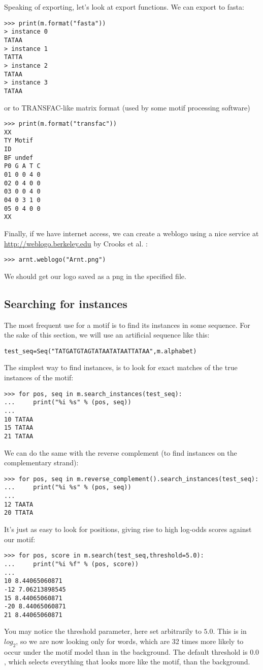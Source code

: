 \documentclass{article}
\begin{document}
Speaking of exporting, let's look at export functions. We can export to fasta:
\begin{verbatim}
>>> print(m.format("fasta"))
> instance 0
TATAA
> instance 1
TATTA
> instance 2
TATAA
> instance 3
TATAA
\end{verbatim}
or to TRANSFAC-like matrix format (used by some motif processing software)
\begin{verbatim}
>>> print(m.format("transfac"))
XX
TY Motif
ID 
BF undef
P0 G A T C
01 0 0 4 0
02 0 4 0 0
03 0 0 4 0
04 0 3 1 0
05 0 4 0 0
XX
\end{verbatim}

Finally, if we have internet access, we can create a weblogo using a nice service at \url{http://weblogo.berkeley.edu} by Crooks et al. \cite{crooks2004}:
\begin{verbatim}
>>> arnt.weblogo("Arnt.png")
\end{verbatim}
We should get our logo saved as a png in the specified file.

\subsection{Searching for instances}
\label{sec:search}

The most frequent use for a motif is to find its instances in some
sequence. For the sake of this section, we will use an artificial sequence like this:

\begin{verbatim}
test_seq=Seq("TATGATGTAGTATAATATAATTATAA",m.alphabet)
\end{verbatim}

The simplest way to find instances, is to look for exact matches of
the true instances of the motif:
\begin{verbatim}
>>> for pos, seq in m.search_instances(test_seq):
...     print("%i %s" % (pos, seq))
... 
10 TATAA
15 TATAA
21 TATAA
\end{verbatim}
We can do the same with the reverse complement (to find instances on the complementary strand):
\begin{verbatim}
>>> for pos, seq in m.reverse_complement().search_instances(test_seq):
...     print("%i %s" % (pos, seq))
... 
12 TAATA
20 TTATA
\end{verbatim}

It's just as easy to look for positions, giving rise to high log-odds scores against our motif:
\begin{verbatim}
>>> for pos, score in m.search(test_seq,threshold=5.0):
...     print("%i %f" % (pos, score))
... 
10 8.44065060871
-12 7.06213898545
15 8.44065060871
-20 8.44065060871
21 8.44065060871
\end{verbatim}
You may notice the threshold parameter, here set arbitrarily to
$5.0$. This is in $log_2$, so we are now looking only for words, which
are 32 times more likely to occur under the motif model than in the
background. The default threshold is $0.0$, which selects everything
that looks more like the motif, than the background.
\end{document}
